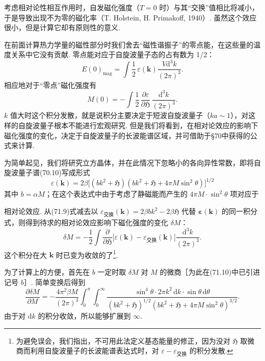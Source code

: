 考虑相对论性相互作用时，自发磁化强度（$T=0$ 时）与其“交换”值相比将减小，于是导致出现不为零的磁化率（T. Holstein, H. Primakoff, 1940）. 虽然这个效应很小，但是计算它却有原则性的意义.

在前面计算热力学量的磁性部分时我们舍去“磁性谐振子”的零点能，在这些量的温度关系中它没有贡献. 零点能对应于自旋波量子态的占有数为 1/2：
\begin{equation*}
E(0)_{\mathrm{mag}}=\int\frac{1}{2}\,\varepsilon(\bm{k})\frac{V\mathrm{d}^3k}{(2\pi)^3}.
\end{equation*}
相应地对于“零点”磁化强度有
\begin{equation}
M(0)=-\int\frac{1}{2}\,\frac{\partial\varepsilon}{\partial\mathfrak{H}}\,
\frac{\mathrm{d}^3k}{(2\pi)^3}.
\end{equation}
$k$ 值大时这个积分发散，就是说积分主要决定于短波自旋波量子（$ka\sim1$），对这样的自旋波量子根本不能进行宏观研究. 但是我们将看到，在相对论效应的影响下磁化强度的变化，决定于自旋波量子的长波能谱区域，并可借助于§70中获得的公式来计算.

为简单起见，我们将研究立方晶体，并在此情况下忽略小的各向异性常数，即将自旋波量子谱(70.10)写成形式
\begin{equation}
\varepsilon(\bm{k})=2\beta\bigl[(bk^2+\mathfrak{H})(bk^2+\mathfrak{H}+4\pi M\sin^2\theta)\bigr]^{1/2}
\end{equation}
其中 $b=\alpha M$；在这个表达式中由于考虑了静磁能而产生的 $4\pi M\cdot\sin^2\theta$ 项对应于

相对论效应. 从(71.9)式减去以 $\varepsilon_{\text{交换}}(\bm{k})=2\beta bk^2-2\beta\mathfrak{H}$ 代替 $\bm{\varepsilon}(\bm{k})$ 的同一积分式，则得到待求的相对论效应影响下磁化强度的变化 $\delta M$：
\begin{equation}
\delta M=-\frac{1}{2}\int\frac{\partial}{\partial\mathfrak{H}}
\bigl[\varepsilon(\bm{k})-\varepsilon_{\text{交换}}(\bm{k})\bigr]
\frac{\mathrm{d}^3k}{(2\pi)^3}.
\end{equation}
这个积分在大 $\bm{k}$ 时已变为收敛的了\footnote{为避免误会，我们指出，不可用此法定义基态能量的修正，因为没对 $\mathfrak{H}$ 取微商而利用自旋波量子的长波能谱表达式时，对 $\varepsilon-\varepsilon_{\text{交换}}$ 的积分发散.}.

为了计算上的方便，首先在 $b$ 一定时取 $\delta M$ 对 $M$ 的微商［为此在(71.10)中已引进记号 $b$］. 简单变换后得到
\begin{equation*}
\frac{\partial\delta M}{\partial M}=-\frac{4\pi^2\beta M}{(2\pi)^3}
\int_0^{\pi}\int_0^{\infty}
\frac{\sin^4\theta\cdot2\pi k^2\,\mathrm{d}k\cdot\sin\theta\,\mathrm{d}\theta}
{(bk^2+\mathfrak{H})^{1/2}(bk^2+\mathfrak{H}+4\pi M\sin^2\theta)^{3/2}}.
\end{equation*}
由于对 $\mathrm{d}k$ 的积分收敛，所以能够扩展到 $\infty$.

